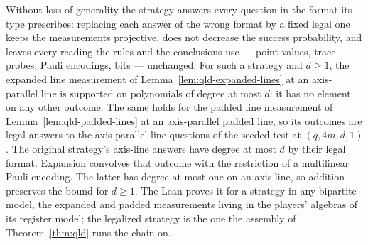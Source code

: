 \begin{lemma}
\label{lem:qld-axis-degree}
\leanok
Without loss of generality the strategy answers every question in the format its type
prescribes: replacing each answer of the wrong format by a fixed legal one keeps the
measurements projective, does not decrease the success probability, and leaves every
reading the rules and the conclusions use --- point values, trace probes, Pauli encodings,
bits --- unchanged. For such a strategy and $d \geq 1$, the expanded line measurement of
Lemma~\ref{lem:qld-expanded-lines} at an axis-parallel line is supported on polynomials of
degree at most $d$: it has no element on any other outcome. The same holds for the padded
line measurement of Lemma~\ref{lem:qld-padded-lines} at an axis-parallel padded line, so
its outcomes are legal answers to the axis-parallel line questions of the seeded test at
$(q,4m,d,1)$.
The original strategy's axis-line answers have degree at most $d$ by their legal format.
Expansion convolves that outcome with the restriction of a multilinear Pauli encoding. The
latter has degree at most one on an axis line, so addition preserves the bound for $d\geq1$.
The Lean proves it for a strategy in any bipartite model, the expanded and padded measurements
living in the players' algebras of its register model; the legalized strategy is the one the
assembly of Theorem~\ref{thm:qld} runs the chain on.
\end{lemma}

